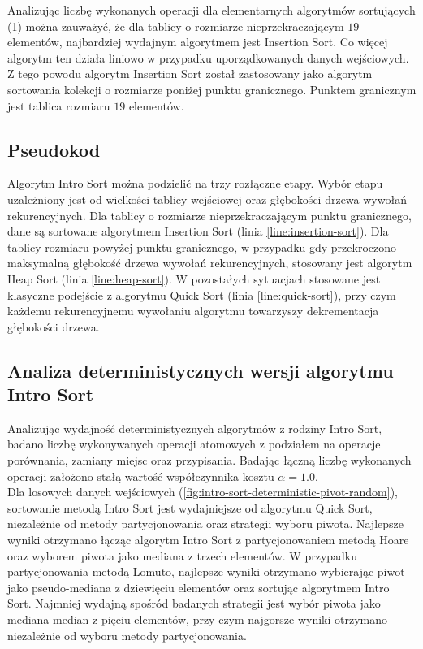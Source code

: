 Analizując liczbę wykonanych operacji dla elementarnych algorytmów sortujących (\ref{fig:sorting-small-array}) można zauważyć, że dla tablicy o rozmiarze nieprzekraczającym $19$ elementów, najbardziej wydajnym algorytmem jest Insertion Sort. Co więcej algorytm ten działa liniowo w przypadku uporządkowanych danych wejściowych. Z tego powodu algorytm Insertion Sort został zastosowany jako algorytm sortowania kolekcji o rozmiarze poniżej punktu granicznego. Punktem granicznym jest tablica rozmiaru $19$ elementów.\\

\begin{figure}[]
	\centering
	
	\caption[]{}
	\label{fig:sorting-small-array}
\end{figure}

\subsection{Pseudokod}
Algorytm Intro Sort można podzielić na trzy rozłączne etapy. Wybór etapu uzależniony jest od wielkości tablicy wejściowej oraz głębokości drzewa wywołań rekurencyjnych. Dla tablicy o rozmiarze nieprzekraczającym punktu granicznego, dane są sortowane algorytmem Insertion Sort (linia \ref{line:insertion-sort}). Dla tablicy rozmiaru powyżej punktu granicznego, w przypadku gdy przekroczono maksymalną głębokość drzewa wywołań rekurencyjnych, stosowany jest algorytm Heap Sort (linia \ref{line:heap-sort}). W pozostałych sytuacjach stosowane jest klasyczne podejście z algorytmu Quick Sort (linia \ref{line:quick-sort}), przy czym każdemu rekurencyjnemu wywołaniu algorytmu towarzyszy dekrementacja głębokości drzewa.



\subsection{Analiza deterministycznych wersji algorytmu Intro Sort}
Analizując wydajność deterministycznych algorytmów z rodziny Intro Sort, badano liczbę wykonywanych operacji atomowych z podziałem na operacje porównania, zamiany miejsc oraz przypisania. Badając łączną liczbę wykonanych operacji założono stałą wartość współczynnika kosztu $\alpha = 1.0$.\\

Dla losowych danych wejściowych (\ref{fig:intro-sort-deterministic-pivot-random}), sortowanie metodą Intro Sort jest wydajniejsze od algorytmu Quick Sort, niezależnie od metody partycjonowania oraz strategii wyboru piwota. Najlepsze wyniki otrzymano łącząc algorytm Intro Sort z partycjonowaniem metodą Hoare oraz wyborem piwota jako mediana z trzech elementów. W przypadku partycjonowania metodą Lomuto, najlepsze wyniki otrzymano wybierając piwot jako pseudo-mediana z dziewięciu elementów oraz sortując algorytmem Intro Sort. Najmniej wydajną spośród badanych strategii jest wybór piwota jako mediana-median z pięciu elementów, przy czym najgorsze wyniki otrzymano niezależnie od wyboru metody partycjonowania.\\

